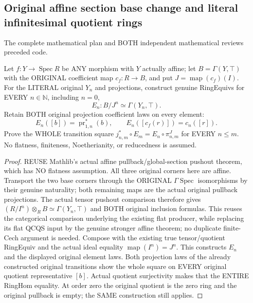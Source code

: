 \subsection{Original affine section base change and literal infinitesimal quotient rings}

The complete mathematical plan and BOTH independent mathematical reviews preceded code.

\begin{theorem}
\label{scheme:actual-affine-infinitesimal-section-quotient}
\leanok
{}
Let $f:Y\to\operatorname{Spec}R$ be ANY morphism with $Y$ actually
affine; let $B=\Gamma(Y,\top)$ with the ORIGINAL coefficient map
$c_f:R\to B$, and put $J=\operatorname{map}(c_f)(I)$.
For the LITERAL original $Y_n$ and projections, construct genuine
RingEquivs for EVERY $n\in\mathbb N$, including $n=0$,
\[
 E_n:B/J^n\simeq\Gamma(Y_n,\top).
\]
Retain BOTH original projection coefficient laws on every element:
\[
 E_n([b])=\operatorname{pr}_{1,n}^*(b),\qquad
 E_n([c_f(r)])=c_n([r]).
\]
Prove the WHOLE transition square
$j_{n,m}^*\circ E_m=E_n\circ\pi^J_{n,m}$ for EVERY $n\le m$.
No flatness, finiteness, Noetherianity, or reducedness is assumed.
\end{theorem}
\begin{proof}
REUSE Mathlib's actual affine pullback/global-section pushout theorem,
which has NO flatness assumption. All three original corners here are
affine. Transport the two base corners through the ORIGINAL
$\Gamma\operatorname{Spec}$ isomorphisms by their genuine naturality;
both remaining maps are the actual original pullback projections.
The actual tensor pushout comparison therefore gives
$(R/I^n)\otimes_R B\simeq\Gamma(Y_n,\top)$ and BOTH original
inclusion formulas. This reuses the categorical comparison underlying
the existing flat producer, while replacing its flat QCQS input by the
genuine stronger affine theorem; no duplicate finite-Cech argument is
needed. Compose with the existing true tensor/quotient RingEquiv and
the actual ideal equality $\operatorname{map}(I^n)=J^n$. This constructs
$E_n$ and the displayed original element laws. Both projection laws
of the already constructed original transitions show the whole square
on EVERY original quotient representative $[b]$. Actual quotient
surjectivity makes that the ENTIRE RingHom equality. At order zero the
original quotient is the zero ring and the original pullback is empty;
the SAME construction still applies.
\end{proof}
